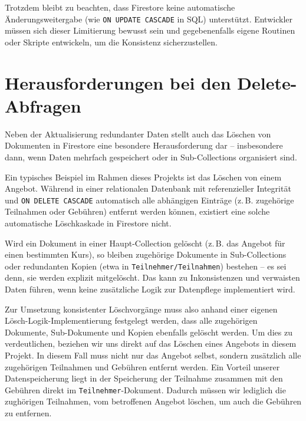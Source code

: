 \documentclass[12pt,a4paper%
              ,oneside     %
              ,titlepage
              ,DIV=13
              ,headinclude
              ,footinclude=false%
              ,cleardoublepage=empty%
              ,parskip=half,
              BCOR=0mm,
              ]{scrreprt}
\begin{document}
Trotzdem bleibt zu beachten, dass Firestore keine automatische Änderungsweitergabe (wie \texttt{ON UPDATE CASCADE} in SQL) unterstützt. Entwickler müssen sich dieser Limitierung bewusst sein und gegebenenfalls eigene Routinen oder Skripte entwickeln, um die Konsistenz sicherzustellen.

\chapter{Herausforderungen bei den Delete-Abfragen}
\label{delete-label}

Neben der Aktualisierung redundanter Daten stellt auch das Löschen von Dokumenten in Firestore eine besondere Herausforderung dar – insbesondere dann, wenn Daten mehrfach gespeichert oder in Sub-Collections organisiert sind.

Ein typisches Beispiel im Rahmen dieses Projekts ist das Löschen von einem Angebot. Während in einer relationalen Datenbank mit referenzieller Integrität und \texttt{ON DELETE CASCADE} automatisch alle abhängigen Einträge (z.\,B. zugehörige Teilnahmen oder Gebühren) entfernt werden können, existiert eine solche automatische Löschkaskade in Firestore nicht.

Wird ein Dokument in einer Haupt-Collection gelöscht (z.\,B. das Angebot für einen bestimmten Kurs), so bleiben zugehörige Dokumente in Sub-Collections oder redundanten Kopien (etwa in \texttt{Teilnehmer/Teilnahmen}) bestehen – es sei denn, sie werden explizit mitgelöscht. Das kann zu Inkonsistenzen und verwaisten Daten führen, wenn keine zusätzliche Logik zur Datenpflege implementiert wird.

Zur Umsetzung konsistenter Löschvorgänge muss also anhand einer eigenen Lösch-Logik-Implementierung festgelegt werden, dass alle zugehörigen Dokumente, Sub-Dokumente und Kopien ebenfalls gelöscht werden. Um dies zu verdeutlichen, beziehen wir uns direkt auf das Löschen eines Angebots in diesem Projekt. In diesem Fall muss nicht nur das Angebot selbst, sondern zusätzlich alle zugehörigen Teilnahmen und Gebühren entfernt werden.
Ein Vorteil unserer Datenspeicherung liegt in der Speicherung der Teilnahme zusammen mit den Gebühren direkt im \texttt{Teilnehmer}-Dokument. Dadurch müssen wir lediglich die zughörigen Teilnahmen, vom betroffenen Angebot löschen, um auch die Gebühren zu entfernen.
\end{document}
